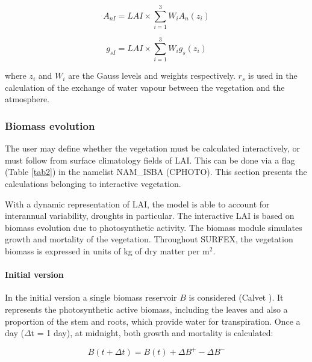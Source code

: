 {\begin{equation}
A_{nI}=LAI \times \sum_{i=1}^{3}W_{i}A_{n}(z_{i})
\end{equation}

\begin{equation}
g_{sI}=LAI \times \sum_{i=1}^{3}W_{i}g_{s}(z_{i})
\end{equation}


where $z_{i}$ and $W_{i}$ are the Gauss levels and weights respectively. $r_{s}$ is used in the calculation of the
exchange of water vapour between the vegetation and the atmosphere.

\subsubsection{Biomass evolution}

The user may define whether the vegetation must be calculated interactively, or must follow from
surface climatology fields of LAI. This can be done via a flag (Table \ref{tab2}) in the namelist NAM\_ISBA
(CPHOTO). This section presents the calculations belonging to interactive vegetation.

With a dynamic representation of LAI, the model is able to account for interannual variability, droughts
in particular. The interactive LAI is based on biomass evolution due to photosynthetic activity. The
biomass module simulates growth and mortality of the vegetation. Throughout SURFEX, the vegetation biomass 
is expressed in units of kg of dry matter per m$^{2}$.

\paragraph{Initial version}

In the initial version a single biomass reservoir $B$ is considered (Calvet ). It represents the
photosynthetic active biomass, including the leaves and also a proportion of the stem and roots, which
provide water for transpiration. Once a day ($\Delta$t = 1 day), at midnight, both growth and mortality is
calculated:

\begin{equation}
B(t + \Delta t ) = B(t)+ \Delta B^{+} - \Delta B^{-}
\end{equation}

}
